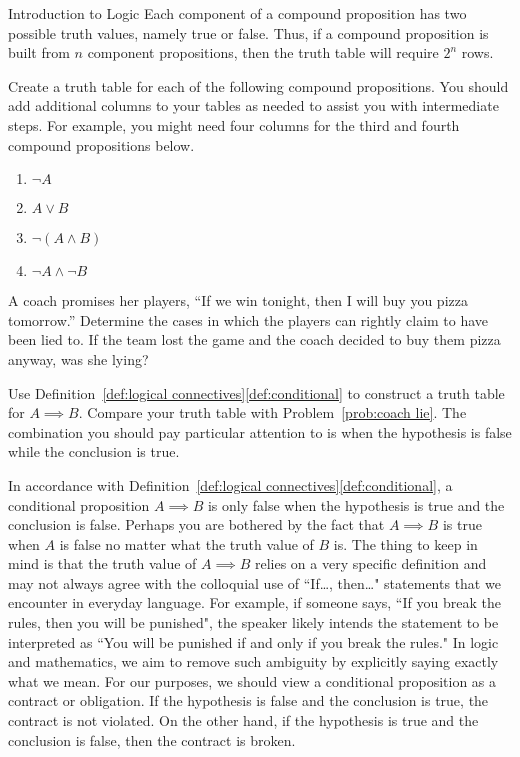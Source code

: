 \begin{section}{Introduction to Logic}
Each component of a compound proposition has two possible truth values, namely true or false. Thus, if a compound proposition is built from $n$ component propositions, then the truth table will require $2^n$ rows.

\begin{problem}
Create a truth table for each of the following compound propositions. You should add additional columns to your tables as needed to assist you with intermediate steps. For example, you might need four columns for the third and fourth compound propositions below.
\begin{enumerate}[label=\textrm{(\alph*)}]
\item $\neg A$
\item $A \vee B$
\item $\neg (A \wedge B)$
\item $\neg A \wedge \neg B$
\end{enumerate}
\end{problem}

\begin{problem}\label{prob:coach lie}
A coach promises her players, ``If we win tonight, then I will buy you pizza tomorrow.''  Determine the cases in which the players can rightly claim to have been lied to. If the team lost the game and the coach decided to buy them pizza anyway, was she lying?
\end{problem}

\begin{problem}
Use Definition~\ref{def:logical connectives}\ref{def:conditional} to construct a truth table for $A \implies B$. Compare your truth table with Problem~\ref{prob:coach lie}. The combination you should pay particular attention to is when the hypothesis is false while the conclusion is true.
\end{problem}

In accordance with Definition~\ref{def:logical connectives}\ref{def:conditional}, a conditional proposition $A\implies B$ is only false when the hypothesis is true and the conclusion is false.  Perhaps you are bothered by the fact that $A\implies B$ is true when $A$ is false no matter what the truth value of $B$ is.  The thing to keep in mind is that the truth value of $A\implies B$ relies on a very specific definition and may not always agree with the colloquial use of ``If\ldots, then\ldots" statements that we encounter in everyday language. For example, if someone says, ``If you break the rules, then you will be punished", the speaker likely intends the statement to be interpreted as ``You will be punished if and only if you break the rules." In logic and mathematics, we aim to remove such ambiguity by explicitly saying exactly what we mean. For our purposes, we should view a conditional proposition as a contract or obligation.  If the hypothesis is false and the conclusion is true, the contract is not violated. On the other hand, if the hypothesis is true and the conclusion is false, then the contract is broken.


\end{section}
